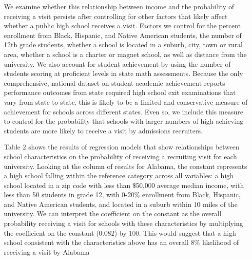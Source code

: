 \documentclass[twoside]{article}
\begin{document}
We examine whether this relationship between income and the probability of receiving a visit persists after controlling for other factors that likely affect whether a public high school receives a visit. Factors we control for the percent enrollment from Black, Hispanic, and Native American students, the number of 12th grade students, whether a school is located in a suburb, city, town or rural area, whether a school is a charter or magnet school, as well as distance from the university. We also account for student achievement by using the number of students scoring at proficient levels in state math assessments. Because the only comprehensive, national dataset on student academic achievement reports performance outcomes from state required high school exit examinations that vary from state to state, this is likely to be a limited and conservative measure of achievement for schools across different states. Even so, we include this measure to control for the probability that schools with larger numbers of high achieving students are more likely to receive a visit by admissions recruiters. 

Table 2 shows the results of regression models that show relationships between school characteristics on the probability of receiving a recruiting visit for each university. Looking at the column of results for Alabama, the constant represents a high school falling within the reference category across all variables: a high school located in a zip code with less than \$50,000 average median income, with less than 50 students in grade 12, with 0-20\% enrollment from Black, Hispanic, and Native American students, and located in a suburb within 10 miles of the university.  We can interpret the coefficient on the constant as the overall probability receiving a visit for schools with these characteristics by multiplying the coefficient on the constant (0.082) by 100. This would suggest that a high school consistent with the characteristics above has an overall 8\% likelihood of receiving a visit by Alabama 
\end{document}
